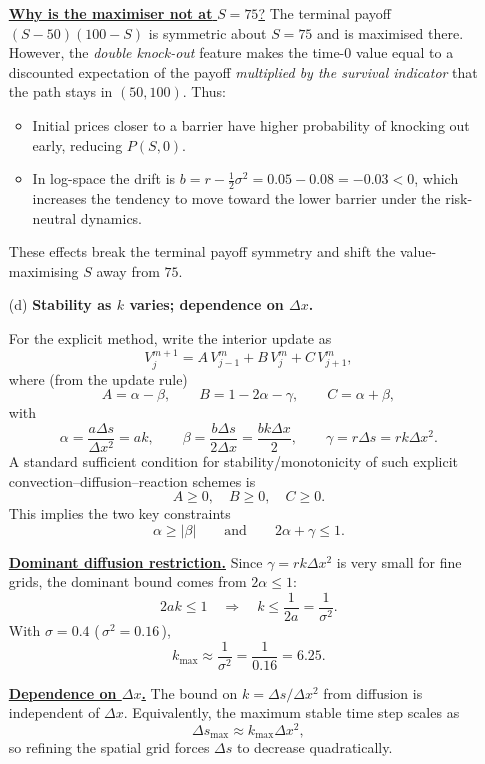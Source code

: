 \documentclass{article}
\begin{document}
\begin{enumerate}
\underline{\textbf{Why is the maximiser not at }$S=75$?}
The terminal payoff $(S-50)(100-S)$ is symmetric about $S=75$ and is maximised there.
However, the \emph{double knock-out} feature makes the time-$0$ value equal to a discounted expectation of the payoff
\emph{multiplied by the survival indicator} that the path stays in $(50,100)$.
Thus:
\begin{itemize}
\item Initial prices closer to a barrier have higher probability of knocking out early, reducing $P(S,0)$.
\item In log-space the drift is $b=r-\frac12\sigma^2=0.05-0.08=-0.03<0$, which increases the tendency to move toward the lower barrier under the risk-neutral dynamics.
\end{itemize}
These effects break the terminal payoff symmetry and shift the value-maximising $S$ away from $75$.

\item[(d)] \textbf{Stability as $k$ varies; dependence on $\Delta x$.}

For the explicit method, write the interior update as
\[
V_j^{m+1}=A\,V_{j-1}^m+B\,V_j^m+C\,V_{j+1}^m,
\]
where (from the update rule)
\[
A=\alpha-\beta,\qquad
B=1-2\alpha-\gamma,\qquad
C=\alpha+\beta,
\]
with
\[
\alpha=\frac{a\Delta s}{\Delta x^2}=a k,
\qquad
\beta=\frac{b\Delta s}{2\Delta x}=\frac{b k\Delta x}{2},
\qquad
\gamma=r\Delta s=rk\Delta x^2.
\]
A standard sufficient condition for stability/monotonicity of such explicit convection--diffusion--reaction schemes is
\[
A\ge 0,\quad B\ge 0,\quad C\ge 0.
\]
This implies the two key constraints
\[
\alpha\ge |\beta|
\qquad\text{and}\qquad
2\alpha+\gamma\le 1.
\]

\medskip
\noindent\underline{\textbf{Dominant diffusion restriction.}}
Since $\gamma=rk\Delta x^2$ is very small for fine grids, the dominant bound comes from $2\alpha\le 1$:
\[
2ak\le 1
\quad\Longrightarrow\quad
k\le \frac{1}{2a}=\frac{1}{\sigma^2}.
\]
With $\sigma=0.4$ (\,$\sigma^2=0.16$\,),
\[
\boxed{k_{\max}\approx \frac{1}{\sigma^2}=\frac{1}{0.16}=6.25.}
\]

\medskip
\noindent\underline{\textbf{Dependence on $\Delta x$.}}
The bound on $k=\Delta s/\Delta x^2$ from diffusion is independent of $\Delta x$.
Equivalently, the maximum stable time step scales as
\[
\boxed{\Delta s_{\max}\approx k_{\max}\Delta x^2,}
\]
so refining the spatial grid forces $\Delta s$ to decrease quadratically.


\end{enumerate}
\end{document}

